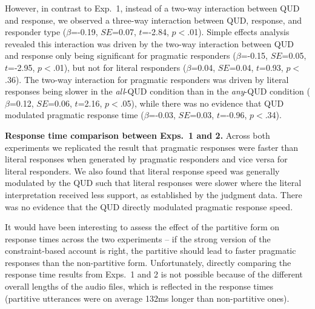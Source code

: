 \documentclass[10pt,letterpaper]{article}
\begin{document}
However, in contrast to Exp.~1, instead of a two-way interaction between QUD and response, we observed a three-way interaction between QUD, response, and responder type ($\beta$=-0.19, $SE$=0.07, $t$=-2.84, $p$$<$.01). Simple effects analysis revealed  this interaction was driven by the two-way interaction between QUD and response only being significant for pragmatic responders ($\beta$=-0.15, $SE$=0.05, $t$=-2.95, $p$$<$.01), but not for literal responders ($\beta$=0.04, $SE$=0.04, $t$=0.93, $p$$<$.36).  The two-way interaction for pragmatic responders was driven by literal responses being slower in the \emph{all}-QUD condition than in the \emph{any}-QUD condition  ($\beta$=0.12, $SE$=0.06, $t$=2.16, $p$$<$.05), while there was no evidence that QUD modulated pragmatic response time  ($\beta$=-0.03, $SE$=0.03, $t$=-0.96, $p$$<$.34).

\noindent \textbf{Response time comparison between Exps.~1 and 2.} Across both experiments we replicated the result that pragmatic responses were faster than literal responses when generated by pragmatic responders and vice versa for literal responders. 
We also found that literal response speed was generally modulated by the QUD such that literal responses were slower where the literal interpretation received less support, as established by the judgment data. There was no evidence that the QUD directly modulated pragmatic response speed.



It would have been interesting to assess the effect of the partitive form on response times across the two experiments -- if the strong version of the constraint-based account is right, the partitive should lead to faster pragmatic responses than the non-partitive form. Unfortunately, directly comparing the response time results from Exps.~1 and 2 is not  possible because of the different overall lengths of the audio files, which is reflected in the response times (partitive utterances were on average 132ms longer than non-partitive ones).
\end{document}
